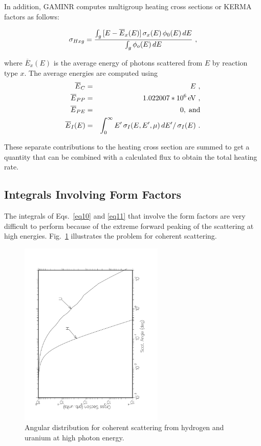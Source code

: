 In addition, GAMINR computes multigroup heating cross sections or KERMA
 factors as follows:

  \begin{equation}
    \sigma_{Hxg}={{\int_g\,[E-\overline{E}_x(E)]\,\sigma_x(E)\,\phi_0(E)\,dE}
    \over {\int_g\phi_o(E)\,dE}} \,\,,
  \end{equation}

\noindent
where $\overline{E}_x(E)$ is the average energy of photons scattered from
$E$ by reaction type $x$.  The average energies are computed using
  \begin{eqnarray}
    \overline{E}_C    &=& E\,\,,\\
    \overline{E}_{PP} &=& 1.022007*10^6 {\,\rm eV}\,\,,\\
    \overline{E}_{PE} &=& 0,\;\hbox{and}\\
    \overline{E}_I(E) &=& \int_0^\infty E'\,\sigma_I(E,E',\mu)\,dE
    '/\,\sigma_I(E)\,\,.
  \end{eqnarray}

These separate contributions to the heating cross section are summed
to get a quantity that can be combined with a calculated flux to
obtain the total heating rate.

\subsection{Integrals Involving Form Factors}
\label{ssGAMINR_FormFact}

The integrals of Eqs.~\ref{eq10} and \ref{eq11} that involve the form
factors are very difficult to perform because of the extreme forward peaking
of the scattering at high energies.  Fig.~\ref{fig1} illustrates the
problem for coherent scattering.

\begin{figure}[thb]\centering
\includegraphics[keepaspectratio, height=3.5in, angle=270]{figs/gaminr1ack}
\caption[Photon coherent scattering angular distributions]{Angular distribution
 for coherent scattering from hydrogen and uranium at high photon energy.}
\label{fig1}
\end{figure}

